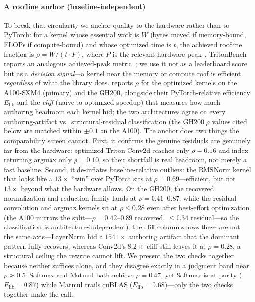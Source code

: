 \paragraph{A roofline anchor (baseline-independent)}
To break that circularity we anchor quality to the hardware rather than to PyTorch: for a kernel whose essential work is $W$ (bytes moved if memory-bound, FLOPs if compute-bound) and whose optimized time is $t$, the achieved roofline fraction is $\rho = W / (t \cdot P)$, where $P$ is the relevant hardware peak~\cite{williams2009roofline}.
TritonBench reports an analogous achieved-peak metric~\cite{li2025tritonbench}; we use it not as a leaderboard score but as a \emph{decision signal}---a kernel near the memory or compute roof is efficient \emph{regardless} of what the library does.
 reports $\rho$ for the optimized kernels on the A100-SXM4 (primary) and the GH200, alongside their PyTorch-relative efficiency $E_\text{lib}$ and the \emph{cliff} (naive-to-optimized speedup) that measures how much authoring headroom each kernel hid; the two architectures agree on every authoring-artifact vs.\ structural-residual classification (the GH200 $\rho$ values cited below are matched within $\pm0.1$ on the A100).
The anchor does two things the comparability screen cannot.
First, it confirms the genuine residuals are genuinely far from the hardware: optimized Triton Conv2d reaches only $\rho=0.16$ and index-returning argmax only $\rho=0.10$, so their shortfall is real headroom, not merely a fast baseline.
Second, it de-inflates baseline-relative outliers: the RMSNorm kernel that looks like a $13\times$ ``win'' over PyTorch sits at $\rho=0.69$---efficient, but not $13\times$ beyond what the hardware allows.
On the GH200, the recovered normalization and reduction family lands at $\rho=0.41$--$0.87$, while the residual convolution and argmax kernels sit at $\rho\le0.28$ even after best-effort optimization (the A100 mirrors the split---$\rho=0.42$--$0.89$ recovered, $\le0.34$ residual---so the classification is architecture-independent); the cliff column shows these are not the same axis---LayerNorm hid a $1541\times$ authoring artifact that the dominant pattern fully recovers, whereas Conv2d's $8.2\times$ cliff still leaves it at $\rho=0.28$, a structural ceiling the rewrite cannot lift.
We present the two checks together because neither suffices alone, and they disagree exactly in a judgment band near $\rho\approx0.5$: Softmax and Matmul both achieve $\rho=0.47$, yet Softmax is at parity ($E_\text{lib}=0.87$) while Matmul trails cuBLAS ($E_\text{lib}=0.68$)---only the two checks together make the call.

